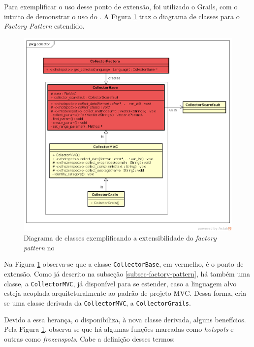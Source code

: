 Para exemplificar o uso desse ponto de extensão, foi utilizado o \textsf{Grails}, com o intuito de demonstrar o uso do \Scarefault. A Figura
\ref{collector-grails-class-diagram} traz o diagrama de classes para o
\textit{Factory Pattern} estendido.
\begin{figure}[h]
  \centering
    \includegraphics[width=\textwidth]{figuras/collector-grails-class-diagram.png}
    \caption{Diagrama de classes exemplificando a extensibilidade do \textit{factory pattern} no \framework}
    \label{collector-grails-class-diagram}
\end{figure}
\FloatBarrier

Na Figura \ref{collector-grails-class-diagram} observa-se que a classe
\lstinline|CollectorBase|, em vermelho, é o ponto de extensão. Como já descrito
na subseção \ref{subsec-factory-pattern}, há também uma classe, a \lstinline|CollectorMVC|,
já disponível para se estender, caso a linguagem alvo esteja acoplada
arquiteturalmente ao padrão de projeto MVC. Dessa forma, cria-se uma classe
derivada da \lstinline|CollectorMVC|, a \lstinline|CollectorGrails|.

Devido a essa herança, o \framework disponibiliza, à nova classe derivada,
alguns benefícios. Pela Figura \ref{collector-grails-class-diagram}, observa-se
que há algumas funções marcadas como \textit{hotspots} e outras como 
\textit{frozenspots}. Cabe a definição desses termos:

